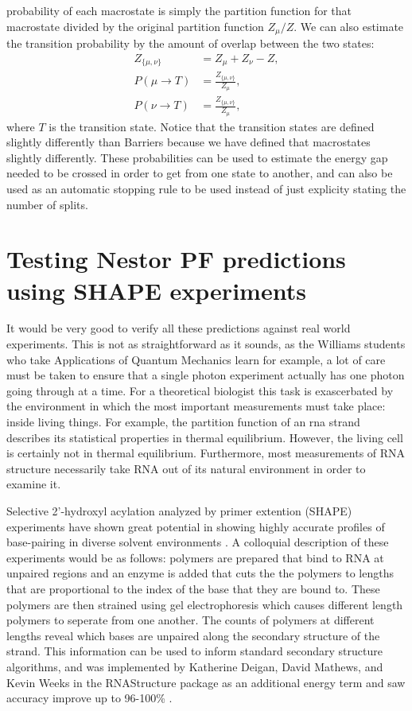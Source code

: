 probability of each macrostate is simply the partition function for
that macrostate divided by the original partition function
$Z_\mu/Z$. We can also estimate the transition probability by the
amount of overlap between the two states:
\begin{align}
Z_{\{\mu,\nu\}} &= Z_\mu + Z_\nu - Z, \\
P( \mu \to T) &= \frac{Z_{\{\mu,\nu\}}}{Z_\mu}, \\
P( \nu \to T) &= \frac{Z_{\{\mu,\nu\}}}{Z_\mu},
\end{align}
where $T$ is the transition state. Notice that the transition states
are defined slightly differently than Barriers because we have defined
that macrostates slightly differently. These probabilities can be used
to estimate the energy gap needed to be crossed in order to get from
one state to another, and can also be used as an automatic stopping
rule to be used instead of just explicity stating the number of
splits.

\section{Testing Nestor PF predictions using SHAPE experiments}

It would be very good to verify all these predictions against real
world experiments.  This is not as straightforward as it sounds, as
the Williams students who take Applications of Quantum Mechanics learn
for example, a lot of care must be taken to ensure that a single
photon experiment actually has one photon going through at a time. For
a theoretical biologist this task is exascerbated by the environment
in which the most important measurements must take place: inside
living things. For example, the partition function of an rna strand
describes its statistical properties in thermal equilibrium. However,
the living cell is certainly not in thermal equilibrium. Furthermore,
most measurements of RNA structure necessarily take RNA out of its
natural environment in order to examine it. 

Selective 2'-hydroxyl acylation analyzed by primer extention (SHAPE)
experiments have shown great potential in showing highly accurate
profiles of base-pairing in diverse solvent environments
\cite{wilkinson2006selective}. A colloquial description of these
experiments would be as follows: polymers are prepared that bind to
RNA at unpaired regions and an enzyme is added that cuts the the
polymers to lengths that are proportional to the index of the base
that they are bound to. These polymers are then strained using gel
electrophoresis which causes different length polymers to seperate
from one another. The counts of polymers at different lengths reveal
which bases are unpaired along the secondary structure of the
strand. This information can be used to inform standard secondary
structure algorithms, and was implemented by Katherine Deigan, David
Mathews, and Kevin Weeks in the RNAStructure package as an additional
energy term and saw accuracy improve up to 96-100\%
\cite{deigan2008accurate}.

